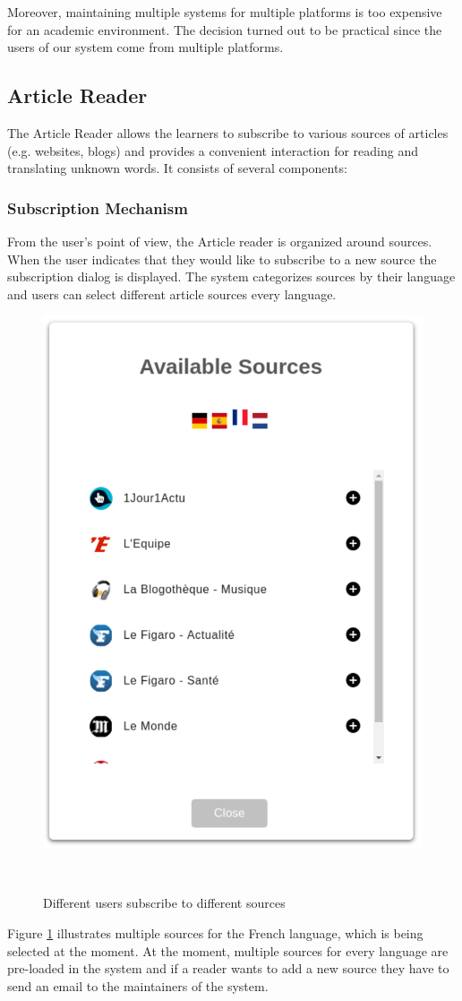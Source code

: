 Moreover, maintaining multiple systems for multiple platforms is too expensive for an academic environment. The decision turned out to be practical since the users of our system come from multiple platforms.


\subsection{Article Reader}

The Article Reader allows the learners to subscribe to various sources of articles (e.g. websites, blogs) and provides a convenient interaction for reading and translating unknown words. It consists of several components:

\newpage
\subsubsection{Subscription Mechanism}
From the user's point of view, the Article reader is organized around sources. When the user indicates that they would like to subscribe to a new source the subscription dialog is displayed. The system categorizes sources by their language and users can select different article sources every language. 

    \begin{figure}[h!]
    \centering
      \includegraphics[width=0.4\columnwidth]{figures/available_sources}
      \caption{Different users subscribe to different sources}~\label{fig:system_subscriptions}
    \end{figure}


Figure \ref{fig:system_subscriptions} illustrates multiple sources for the French language, which is being selected at the moment. 
At the moment, multiple sources for every language are pre-loaded in the system and if a reader wants to add a new source they have to send an email to the maintainers of the system. 

